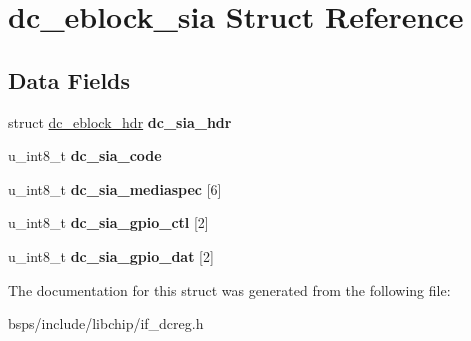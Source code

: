 \hypertarget{structdc__eblock__sia}{}\section{dc\+\_\+eblock\+\_\+sia Struct Reference}
\label{structdc__eblock__sia}
\subsection*{Data Fields}
\begin{DoxyCompactItemize}
\item 
\mbox{\label{structdc__eblock__sia_af5225d0fdd98bd1ca1a5897023f8ead8}} 
struct \mbox{\hyperlink{structdc__eblock__hdr}{dc\+\_\+eblock\+\_\+hdr}} {\bfseries dc\+\_\+sia\+\_\+hdr}
\item 
\mbox{\label{structdc__eblock__sia_a19af3648a256b6e0cfa2d2176dde1151}} 
u\+\_\+int8\+\_\+t {\bfseries dc\+\_\+sia\+\_\+code}
\item 
\mbox{\label{structdc__eblock__sia_a2427c82b86e1e4b289d9752d65872c42}} 
u\+\_\+int8\+\_\+t {\bfseries dc\+\_\+sia\+\_\+mediaspec} \mbox{[}6\mbox{]}
\item 
\mbox{\label{structdc__eblock__sia_a9acfd472c4f1900caa8ff6316f5c42b4}} 
u\+\_\+int8\+\_\+t {\bfseries dc\+\_\+sia\+\_\+gpio\+\_\+ctl} \mbox{[}2\mbox{]}
\item 
\mbox{\label{structdc__eblock__sia_a7b26a7e6c9a23014e022898f4a35f7e5}} 
u\+\_\+int8\+\_\+t {\bfseries dc\+\_\+sia\+\_\+gpio\+\_\+dat} \mbox{[}2\mbox{]}
\end{DoxyCompactItemize}


The documentation for this struct was generated from the following file\+:\begin{DoxyCompactItemize}
\item 
bsps/include/libchip/if\+\_\+dcreg.\+h\end{DoxyCompactItemize}
